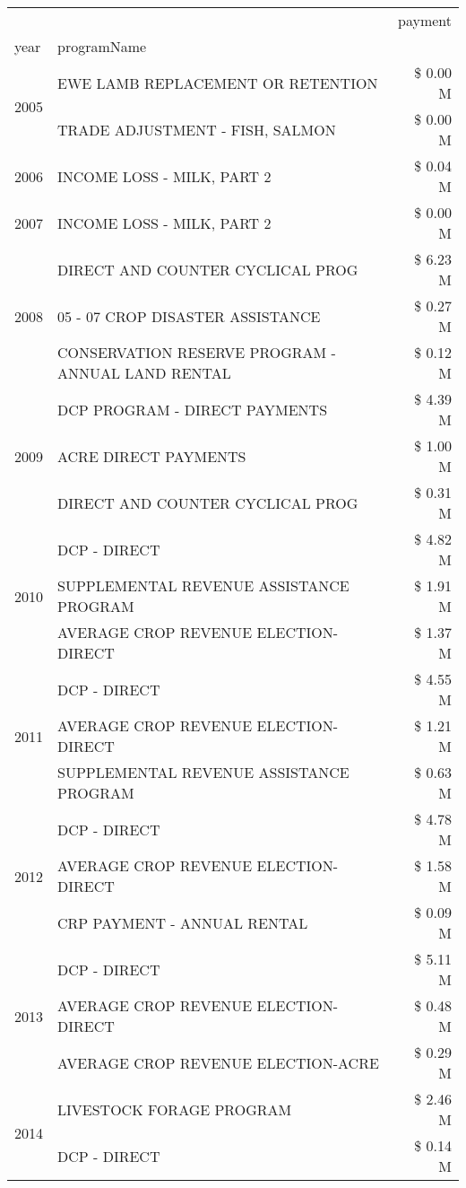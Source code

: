 \begin{tabular}{llr}
\toprule
 &  & payment \\
year & programName &  \\
\midrule
\multirow[t]{2}{*}{2005} & EWE LAMB REPLACEMENT OR RETENTION & \$ 0.00 M \\
 & TRADE ADJUSTMENT - FISH, SALMON & \$ 0.00 M \\
\cline{1-3}
2006 & INCOME LOSS - MILK, PART 2 & \$ 0.04 M \\
\cline{1-3}
2007 & INCOME LOSS - MILK, PART 2 & \$ 0.00 M \\
\cline{1-3}
\multirow[t]{3}{*}{2008} & DIRECT AND COUNTER CYCLICAL PROG & \$ 6.23 M \\
 & 05 - 07 CROP DISASTER ASSISTANCE & \$ 0.27 M \\
 & CONSERVATION RESERVE PROGRAM - ANNUAL LAND RENTAL & \$ 0.12 M \\
\cline{1-3}
\multirow[t]{3}{*}{2009} & DCP PROGRAM - DIRECT PAYMENTS & \$ 4.39 M \\
 & ACRE DIRECT PAYMENTS & \$ 1.00 M \\
 & DIRECT AND COUNTER CYCLICAL PROG & \$ 0.31 M \\
\cline{1-3}
\multirow[t]{3}{*}{2010} & DCP - DIRECT & \$ 4.82 M \\
 & SUPPLEMENTAL REVENUE ASSISTANCE PROGRAM & \$ 1.91 M \\
 & AVERAGE CROP REVENUE ELECTION-DIRECT & \$ 1.37 M \\
\cline{1-3}
\multirow[t]{3}{*}{2011} & DCP - DIRECT & \$ 4.55 M \\
 & AVERAGE CROP REVENUE ELECTION-DIRECT & \$ 1.21 M \\
 & SUPPLEMENTAL REVENUE ASSISTANCE PROGRAM & \$ 0.63 M \\
\cline{1-3}
\multirow[t]{3}{*}{2012} & DCP - DIRECT & \$ 4.78 M \\
 & AVERAGE CROP REVENUE ELECTION-DIRECT & \$ 1.58 M \\
 & CRP PAYMENT - ANNUAL RENTAL & \$ 0.09 M \\
\cline{1-3}
\multirow[t]{3}{*}{2013} & DCP - DIRECT & \$ 5.11 M \\
 & AVERAGE CROP REVENUE ELECTION-DIRECT & \$ 0.48 M \\
 & AVERAGE CROP REVENUE ELECTION-ACRE & \$ 0.29 M \\
\cline{1-3}
\multirow[t]{3}{*}{2014} & LIVESTOCK FORAGE PROGRAM & \$ 2.46 M \\
 & DCP - DIRECT & \$ 0.14 M \\

\end{tabular}
